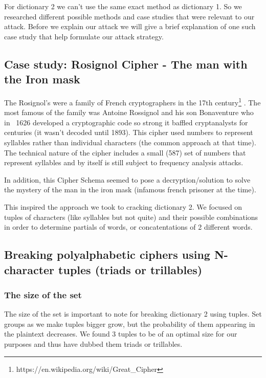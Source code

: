 \documentclass[pdftex,12pt,letter]{article}
\begin{document}
For dictionary 2 we can't use the same exact method as dictionary 1.
So we researched different possible methods and case studies that were 
relevant to our attack. Before we explain our attack we will give a 
brief explanation of one such case study that help formulate our attack
strategy.  

\subsection{Case study: Rosignol Cipher - The man with the Iron mask}

The Rosignol's were a family of French cryptographers in the 17th
century\footnote{ https://en.wikipedia.org/wiki/Great\_Cipher} .  The most
famous of the family was Antoine Rossignol and his son Bonaventure who in ~1626
developed a cryptographic code so strong it baffled cryptanalysts for centuries
(it wasn't decoded until 1893). This cipher used numbers to represent syllables
rather than individual characters (the common approach at that time).  The
technical nature of the cipher includes a small (587) set of numbers that
represent syllables and by itself is still subject to frequency analysis
attacks. 

In addition, this Cipher Schema seemed to pose a decryption/solution to solve the 
mystery of the man in the iron mask (infamous french prisoner at the time). 

This inspired the approach we took to cracking dictionary 2. We focused on 
tuples of characters (like syllables but not quite) and their possible combinations
in order to determine partials of words, or concatentations of 2 different words. 

\subsection{Breaking polyalphabetic ciphers using N-character tuples (triads or trillables)}

\subsubsection{The size of the set}

The size of the set is important to note for breaking dictionary 2 using
tuples.  Set groups as we make tuples bigger grow, but the probability of them
appearing in the plaintext decreases. We found 3 tuples to be of an optimal
size for our purposes and thus have dubbed them triads or trillables. 
\end{document}
